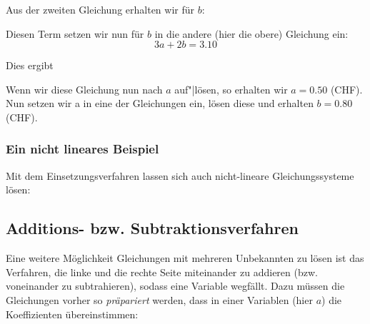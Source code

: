 
Aus der zweiten Gleichung erhalten wir für $b$:


Diesen Term setzen wir nun für $b$ in die andere (hier die obere) Gleichung ein:
$$3a+2b = 3.10$$

Dies ergibt


Wenn wir diese Gleichung nun nach $a$ auf"|lösen, so erhalten wir $a = 0.50$ (CHF).
Nun setzen wir a in eine der Gleichungen ein, lösen diese und erhalten $b = 0.80$ (CHF).



\subsubsection{Ein nicht lineares Beispiel}
Mit dem Einsetzungsverfahren lassen sich auch nicht-lineare
Gleichungssysteme lösen:

\newpage
\subsection{Additions- bzw. Subtraktionsverfahren}
Eine weitere Möglichkeit Gleichungen mit mehreren Unbekannten zu lösen ist das Verfahren, die linke und die rechte Seite miteinander zu addieren (bzw. voneinander zu subtrahieren), sodass eine Variable wegfällt. Dazu müssen die Gleichungen vorher so \textit{präpariert} werden, dass in einer Variablen (hier \zB $a$) die Koeffizienten übereinstimmen:

